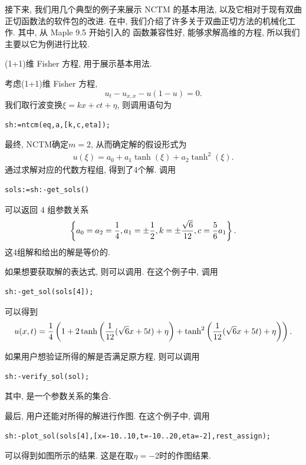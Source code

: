 接下来, 我们用几个典型的例子来展示 NCTM 的基本用法, 以及它相对于现有双曲正切函数法的软件包的改进. 在中, 我们介绍了许多关于双曲正切方法的机械化工作. 其中, 从 Maple 9.5 开始引入的  函数兼容性好, 能够求解高维的方程, 所以我们主要以它为例进行比较. 

\begin{example}(1+1)维 Fisher 方程, 用于展示基本用法.

考虑(1+1)维 Fisher 方程\cite{guo1991analytic},
\begin{equation}
    u_t-u_{x,x}-u(1-u)=0.
\end{equation}
我们取行波变换$\xi=kx+ct+\eta$, 则调用语句为
\begin{verbatim}
sh:=ntcm(eq,a,[k,c,eta]);
\end{verbatim}
最终, NCTM确定$m=2$, 从而确定解的假设形式为 
\begin{eqnarray}
    u(\xi)=a_0+a_1 \tanh(\xi)+a_2\tanh^2(\xi).
\end{eqnarray}
通过求解对应的代数方程组, 得到了4个解. 调用 
\begin{verbatim}
sols:=sh:-get_sols()
\end{verbatim}
可以返回 4 组参数关系
\begin{equation}
    \left\{a_0=a_2=\frac{1}{4},a_1=\pm \frac{1}{2},k=\pm \frac{\sqrt 6}{12},c=\frac{5}{6}a_1\right\}. \label{para-rel}
\end{equation}
这4组解和给出的解是等价的.

如果想要获取解的表达式, 则可以调用. 在这个例子中, 调用
\begin{verbatim}
sh:-get_sol(sols[4]);
\end{verbatim}
可以得到
\begin{equation}
    u(x,t)=\frac{1}{4}\left(1+2\tanh\left(\frac{1}{12}(\sqrt{6}x+5t)+\eta\right)+\tanh^2\left(\frac{1}{12}(\sqrt{6}x+5t)+\eta\right)\right). \label{fisher-sol-4}
\end{equation}

如果用户想验证所得的解是否满足原方程, 则可以调用
\begin{verbatim}
sh:-verify_sol(sol);
\end{verbatim}
其中, 是一个参数关系的集合.

最后, 用户还能对所得的解进行作图. 在这个例子中, 调用
\begin{verbatim}
sh:-plot_sol(sols[4],[x=-10..10,t=-10..20,eta=-2],rest_assign);
\end{verbatim}
可以得到如图所示的结果. 这是在取$\eta=-2$时的作图结果. 


\end{example}
